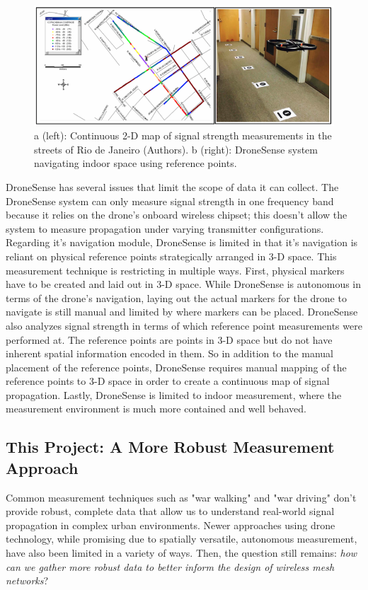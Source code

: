 \documentclass[pageno]{jpaper}
\begin{document}
\begin{figure}[h]
	\caption{a (left): Continuous 2-D map of signal strength measurements in the streets of Rio de Janeiro (Authors). b (right): DroneSense system navigating indoor space using reference points.}
	\includegraphics{related_work}
	\centering
\end{figure}

DroneSense has several issues that limit the scope of data it can collect. The DroneSense system can only measure signal strength in one frequency band because it relies on the drone's onboard wireless chipset; this doesn't allow the system to measure propagation under varying transmitter configurations. Regarding it's navigation module, DroneSense is limited in that it's navigation is reliant on physical reference points strategically arranged in 3-D space. This measurement technique is restricting in multiple ways. First, physical markers have to be created and laid out in 3-D space. While DroneSense is autonomous in terms of the drone's navigation, laying out the actual markers for the drone to navigate is still manual and limited by where markers can be placed. DroneSense also analyzes signal strength in terms of which reference point measurements were performed at. The reference points are points in 3-D space but do not have inherent spatial information encoded in them. So in addition to the manual placement of the reference points, DroneSense requires manual mapping of the reference points to 3-D space in order to create a continuous map of signal propagation. Lastly, DroneSense is limited to indoor measurement, where the measurement environment is much more contained and well behaved. 

\subsection{This Project: A More Robust Measurement Approach}
Common measurement techniques such as "war walking" and "war driving" don't provide robust, complete data that allow us to understand real-world signal propagation in complex urban environments. Newer approaches using drone technology, while promising due to spatially versatile, autonomous measurement, have also been limited in a variety of ways. Then, the question still remains: \textit{how can we gather more robust data to better inform the design of wireless mesh networks}?
\end{document}
